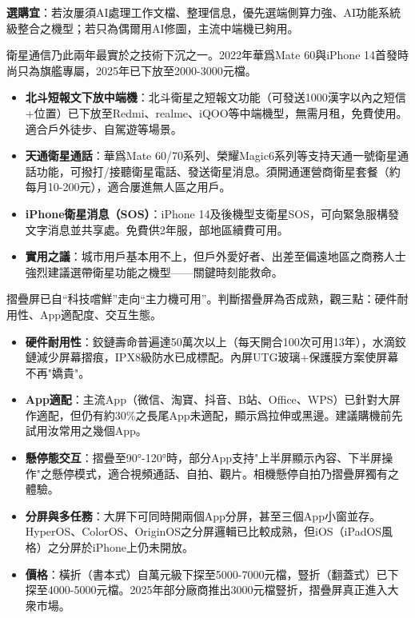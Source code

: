 \textbf{選購宜}：若汝屢須AI處理工作文檔、整理信息，優先選端側算力強、AI功能系統級整合之機型；若只為偶爾用AI修圖，主流中端機已夠用。


衛星通信乃此兩年最實於之技術下沉之一。2022年華爲Mate 60與iPhone 14首發時尚只為旗艦專屬，2025年已下放至2000-3000元檔。

\begin{itemize}
  \item \textbf{北斗短報文下放中端機}：北斗衛星之短報文功能（可發送1000漢字以內之短信+位置）已下放至Redmi、realme、iQOO等中端機型，無需月租，免費使用。適合戶外徒步、自駕遊等場景。
  \item \textbf{天通衛星通話}：華爲Mate 60/70系列、榮耀Magic6系列等支持天通一號衛星通話功能，可撥打/接聽衛星電話、發送衛星消息。須開通運營商衛星套餐（約每月10-200元），適合屢進無人區之用戶。
  \item \textbf{iPhone衛星消息（SOS）}：iPhone 14及後機型支衛星SOS，可向緊急服構發文字消息並共享處。免費供2年服，部地區續費可用。
  \item \textbf{實用之議}：城市用戶基本用不上，但戶外愛好者、出差至偏遠地區之商務人士強烈建議選帶衛星功能之機型——關鍵時刻能救命。
\end{itemize}


摺疊屏已自“科技嚐鮮”走向“主力機可用”。判斷摺疊屏為否成熟，觀三點：硬件耐用性、App適配度、交互生態。

\begin{itemize}
  \item \textbf{硬件耐用性}：鉸鏈壽命普遍達50萬次以上（每天開合100次可用13年），水滴鉸鏈減少屏幕摺痕，IPX8級防水已成標配。內屏UTG玻璃+保護膜方案使屏幕不再"嬌貴"。
  \item \textbf{App適配}：主流App（微信、淘寶、抖音、B站、Office、WPS）已針對大屏作適配，但仍有約30\%之長尾App未適配，顯示爲拉伸或黑邊。建議購機前先試用汝常用之幾個App。
  \item \textbf{懸停態交互}：摺疊至90°-120°時，部分App支持"上半屏顯示內容、下半屏操作"之懸停模式，適合視頻通話、自拍、觀片。相機懸停自拍乃摺疊屏獨有之體驗。
  \item \textbf{分屏與多任務}：大屏下可同時開兩個App分屏，甚至三個App小窗並存。HyperOS、ColorOS、OriginOS之分屏邏輯已比較成熟，但iOS（iPadOS風格）之分屏於iPhone上仍未開放。
  \item \textbf{價格}：橫折（書本式）自萬元級下探至5000-7000元檔，豎折（翻蓋式）已下探至4000-5000元檔。2025年部分廠商推出3000元檔豎折，摺疊屏真正進入大衆市場。
\end{itemize}

